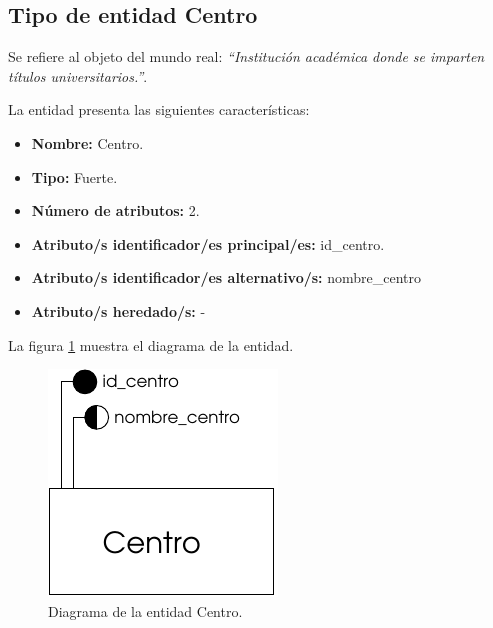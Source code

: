 \subsection{Tipo de entidad Centro}

   \begin{description}

   \item[Definición] Se refiere al objeto del mundo real: \emph{``Institución académica donde se imparten títulos universitarios.''}.

   \item[Características] La entidad presenta las siguientes características:
      \begin{itemize}
         \item \textbf{Nombre:} Centro.
         \item \textbf{Tipo:} Fuerte.
         \item \textbf{Número de atributos:} 2.
         \item \textbf{Atributo/s identificador/es principal/es:} id\_centro.
         \item \textbf{Atributo/s identificador/es alternativo/s:} nombre\_centro
         \item \textbf{Atributo/s heredado/s:} -
      \end{itemize}

   \item[Diagrama] La figura \ref{diagramaCentro} muestra el diagrama de la entidad.
   \item \begin{figure}[!ht]
            \begin{center}
            \includegraphics[]{07.Modelo_Entidad-Interrelacion/7.2.Analisis_Entidades/diagramas/centro.pdf}
            \caption{Diagrama de la entidad Centro.}
            \label{diagramaCentro}
            \end{center}
         \end{figure}


\end{description}

